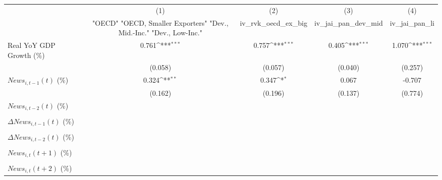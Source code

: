 {
\def\sym#1{\ifmmode^{#1}\else\(^{#1}\)\fi}
\begin{tabular}{l*{4}{c}}
\toprule
                    &\multicolumn{1}{c}{(1)}&\multicolumn{1}{c}{(2)}&\multicolumn{1}{c}{(3)}&\multicolumn{1}{c}{(4)}\\
                    &\multicolumn{1}{c}{ "OECD" "OECD, Smaller Exporters" "Dev., Mid.-Inc." "Dev., Low-Inc."}&\multicolumn{1}{c}{iv_rvk_oecd_ex_big}&\multicolumn{1}{c}{iv_jai_pan_dev_mid}&\multicolumn{1}{c}{iv_jai_pan_li}\\
\midrule
Real YoY GDP Growth (\%)&       0.761\sym{***}&       0.757\sym{***}&       0.405\sym{***}&       1.070\sym{***}\\
                    &     (0.058)         &     (0.057)         &     (0.040)         &     (0.257)         \\
\addlinespace
$ News_{i,t-1}(t)$ (\%)&       0.324\sym{**} &       0.347\sym{*}  &       0.067         &      -0.707         \\
                    &     (0.162)         &     (0.196)         &     (0.137)         &     (0.774)         \\
\addlinespace
$ News_{i,t-2}(t)$ (\%)&                     &                     &                     &                     \\
                    &                     &                     &                     &                     \\
\addlinespace
$ \Delta News_{i,t-1}(t)$ (\%)&                     &                     &                     &                     \\
                    &                     &                     &                     &                     \\
\addlinespace
$ \Delta News_{i,t-2}(t)$ (\%)&                     &                     &                     &                     \\
                    &                     &                     &                     &                     \\
\addlinespace
$ News_{i,t}(t+1)$ (\%)&                     &                     &                     &                     \\
                    &                     &                     &                     &                     \\
\addlinespace
$ News_{i,t}(t+2)$ (\%)&                     &                     &                     &                     \\

\end{tabular}}
